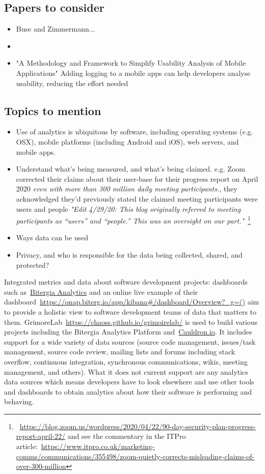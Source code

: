 \subsection{Papers to consider}
\begin{itemize}
    \item Buse and Zimmermann... 
    \item     
    \item "A Methodology and Framework to Simplify Usability Analysis of Mobile Applications" Adding logging to a mobile apps can help developers analyse usability, reducing the effort needed
\end{itemize}

\subsection{Topics to mention}
\begin{itemize}
    \item Use of analytics is ubiquitous by software, including operating systems (e.g. OSX), mobile platforms (including Android and iOS), web servers, and mobile apps. 
    \item Understand what's being measured, and what's being claimed. e.g. Zoom corrected their claims about their user-base for their progress report on  April 2020 \emph{even with more than 300 million daily meeting participants.}, they acknowledged they'd previously stated the claimed meeting participants were users and people \emph{"Edit 4/29/20: This blog originally referred to meeting participants as “users” and “people.” This was an oversight on our part."}~\footnote{~\url{https://blog.zoom.us/wordpress/2020/04/22/90-day-security-plan-progress-report-april-22/} and see the commentary in the ITPro article:~\url{https://www.itpro.co.uk/marketing-comms/communications/355498/zoom-quietly-corrects-misleading-claims-of-over-300-million}}
    \item Ways data can be used
    \item Privacy, and who is responsible for the data being collected, shared, and protected?
\end{itemize}

Integrated metrics and data about software development projects: dashboards such as~\href{https://bitergia.com/bitergia-analytics/}{Bitergia Analytics} and an online live example of their dashboard~\url{https://onap.biterg.io/app/kibana#/dashboard/Overview?_g=()} aim to provide a holistic view to software development teams of data that matters to them. 
GrimoreLab~\url{https://chaoss.github.io/grimoirelab/} is used to build various projects including the Bitergia Analytics Platform and~\href{https://cauldron.io/dashboard/1640}{Cauldron.io}. It includes support for a wide variety of data sources (source code management, issues/task management, source code review, mailing lists and forums including stack overflow, continuous integration, synchronous communications, wikis, meeting management, and others). What it does not current support are any analytics data sources which means developers have to look elsewhere and use other tools and dashboards to obtain analytics about how their software is performing and behaving. 

